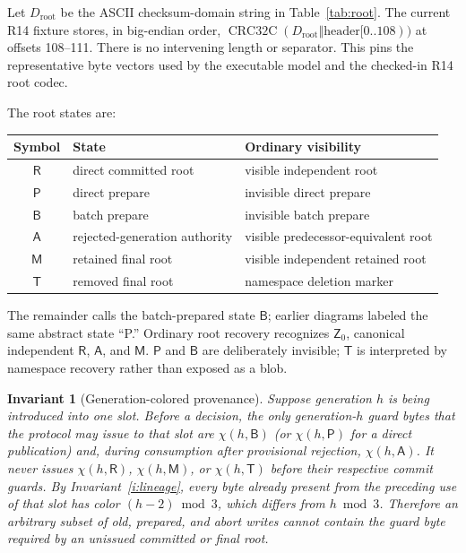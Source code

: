 \documentclass[10pt,twocolumn]{article}
\newtheorem{invariant}{Invariant}
\theoremstyle{remark}
\newcommand{\Root}{\mathsf{R}}
\newcommand{\Prepared}{\mathsf{B}}
\newcommand{\Materialized}{\mathsf{M}}
\newcommand{\Tombstone}{\mathsf{T}}
\newcommand{\Abort}{\mathsf{A}}
\newcommand{\Zero}{\mathsf{Z}}
\begin{document}
Let $D_{\mathrm{root}}$ be the ASCII checksum-domain string in Table~\ref{tab:root}. The current
R14 fixture stores, in big-endian order,
$\operatorname{CRC32C}(D_{\mathrm{root}}\mathbin\Vert\text{header}[0..108))$ at offsets 108--111.
There is no intervening length or separator. This pins the representative byte vectors used by the
executable model and the checked-in R14 root codec.

The root states are:
\begin{center}
\small
\begin{tabularx}{\columnwidth}{@{}c l X@{}}
\toprule
Symbol & State & Ordinary visibility \\
\midrule
$\Root$ & direct committed root & visible independent root \\
$\mathsf{P}$ & direct prepare & invisible direct prepare \\
$\Prepared$ & batch prepare & invisible batch prepare \\
$\Abort$ & rejected-generation authority & visible predecessor-equivalent root \\
$\Materialized$ & retained final root & visible independent retained root \\
$\Tombstone$ & removed final root & namespace deletion marker \\
\bottomrule
\end{tabularx}
\end{center}
The remainder calls the batch-prepared state $\Prepared$; earlier diagrams labeled the same
abstract state ``P.'' Ordinary root recovery recognizes $\Zero_0$, canonical independent
$\Root$, $\Abort$, and $\Materialized$.
$\mathsf{P}$ and $\Prepared$ are deliberately invisible; $\Tombstone$ is interpreted by namespace
recovery rather than exposed as a blob.

\begin{invariant}[Generation-colored provenance]\label{i:color}
Suppose generation $h$ is being introduced into one slot.  Before a decision, the only
generation-$h$ guard bytes that the protocol may issue to that slot are $\chi(h,\Prepared)$ (or
$\chi(h,\mathsf{P})$ for a direct publication) and, during consumption after provisional
rejection, $\chi(h,\Abort)$. It never
issues $\chi(h,\Root)$, $\chi(h,\Materialized)$, or $\chi(h,\Tombstone)$ before their respective
  commit guards. By Invariant~\ref{i:lineage}, every byte already present from the preceding use of
  that slot has color $(h-2)\bmod 3$, which differs from $h\bmod3$. Therefore an arbitrary subset of old, prepared, and
  abort writes cannot contain the guard byte required by an unissued committed or final root.
\end{invariant}
\end{document}
